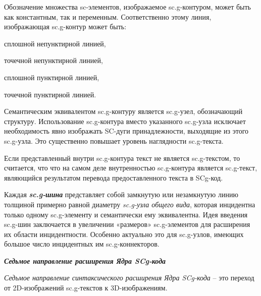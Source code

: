 Обозначение множества sc-элементов, изображаемое sc.g-контуром, может быть как константным, так и переменным. Соответственно этому линия, изображающая sc.g-контур может быть: 

\begin{textitemize}
	\item сплошной непунктирной линией,
	\item точечной непунктирной линией,
	\item сплошной пунктирной линией,
	\item точечной пунктирной линией.
\end{textitemize}

\bigskip
Семантическим эквивалентом sc.g-контуру является sc.g-узел, обозначающий структуру. Использование sc.g-контура вместо указанного sc.g-узла исключает необходимость явно изображать SC-дуги принадлежности, выходящие из этого sc.g-узла. Это существенно повышает уровень наглядности sc.g-текста.

Если представленный внутри sc.g-контура текст не является sc.g-текстом, то считается, что что на самом деле внутренностью sc.g-контура является sc.g-текст, являющийся результатом перевода предоставленного текста в SCg-код.

Каждая \textbf{\textit{sc.g-шина}} представляет собой замкнутую или незамкнутую линию толщиной примерно равной диаметру \textit{sc.g-узла общего вида}, которая инцидентна только одному sc.g-элементу и семантически ему эквивалентна. Идея введения sc.g-шин заключается в увеличении «размеров» sc.g-элементов для расширения их области инцидентности. Особенно актуально это для sc.g-узлов, имеющих большое число инцидентных им sc.g-коннекторов.

\bigskip
\textbf{\textit{Седьмое направление расширения Ядра SCg-кода}}
	
\textit{Седьмое направление синтаксического расширения Ядра SCg-кода} -- это переход от 2D-изображений sc.g-текстов к 3D-изображениям.

